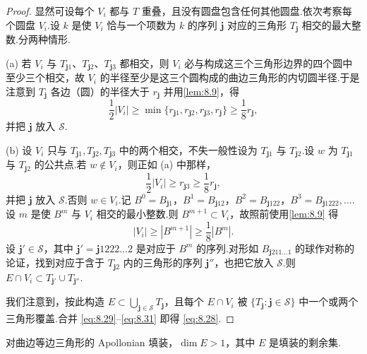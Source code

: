 \begin{proof}
显然可设每个 $V_i$ 都与 $T$ 重叠，且没有圆盘包含任何其他圆盘.依次考察每个圆盘 $V_i$.设 $k$ 是使 $V_i$ 恰与一个项数为 $k$ 的序列 $\mathbf{j}$ 对应的三角形 $T_{\mathbf{j}}$ 相交的最大整数.分两种情形.

(a) 若 $V_i$ 与 $T_{\mathbf{j}1}$、$T_{\mathbf{j}2}$、$T_{\mathbf{j}3}$ 都相交，则 $V_i$ 必与构成这三个三角形边界的四个圆中至少三个相交，故 $V_i$ 的半径至少是这三个圆构成的曲边三角形的内切圆半径.于是注意到 $T_{\mathbf{j}}$ 各边（圆）的半径大于 $r_{\mathbf{j}}$ 并用\cref{lem:8.9}，得
\begin{equation}\label{eq:8.29}
  \frac{1}{2}|V_i|\geq\min\{r_{\mathbf{j}1},r_{\mathbf{j}2},r_{\mathbf{j}3},r_{\mathbf{j}}\}\geq\frac{1}{8}r_{\mathbf{j}},
\end{equation}
并把 $\mathbf{j}$ 放入 $\mathcal{S}$.

(b) 设 $V_i$ 只与 $T_{\mathbf{j}1},T_{\mathbf{j}2},T_{\mathbf{j}3}$ 中的两个相交，不失一般性设为 $T_{\mathbf{j}1}$ 与 $T_{\mathbf{j}2}$.设 $w$ 为 $T_{\mathbf{j}1}$ 与 $T_{\mathbf{j}2}$ 的公共点.若 $w\notin V_i$，则正如 (a) 中那样，
\begin{equation}\label{eq:8.30}
  \frac{1}{2}|V_i|\geq r_{\mathbf{j}3}\geq\frac{1}{8}r_{\mathbf{j}},
\end{equation}
并把 $\mathbf{j}$ 放入 $\mathcal{S}$.否则 $w\in V_i$.记 $B^0=B_{\mathbf{j}1}$，$B^1=B_{\mathbf{j}12}$，$B^2=B_{\mathbf{j}122}$，$B^3=B_{\mathbf{j}1222},\ldots$.设 $m$ 是使 $B^m$ 与 $V_i$ 相交的最小整数.则 $B^{m+1}\subset V_i$，故照前使用\cref{lem:8.9} 得
\begin{equation}\label{eq:8.31}
  |V_i|\geq|B^{m+1}|\geq\frac{1}{8}|B^{m}|.
\end{equation}
设 $\mathbf{j}'\in\mathcal{S}$，其中 $\mathbf{j}'=\mathbf{j}1222\ldots 2$ 是对应于 $B^m$ 的序列.对形如 $B_{\mathbf{j}211\ldots 1}$ 的球作对称的论证，找到对应于含于 $T_{\mathbf{j}2}$ 内的三角形的序列 $\mathbf{j}''$，也把它放入 $\mathcal{S}$.则 $E\cap V_i\subset T_{\mathbf{j}'}\cup T_{\mathbf{j}''}$.

我们注意到，按此构造 $E\subset\bigcup_{\mathbf{j}\in\mathcal{S}}T_{\mathbf{j}}$，且每个 $E\cap V_i$ 被 $\{T_{\mathbf{j}}:\mathbf{j}\in\mathcal{S}\}$ 中一个或两个三角形覆盖.合并 \eqref{eq:8.29}--\eqref{eq:8.31} 即得 \eqref{eq:8.28}.
\end{proof}

\begin{theorem}\label{thm:8.14}
对曲边等边三角形的 Apollonian 填装，$\dim E>1$，其中 $E$ 是填装的剩余集.
\end{theorem}

